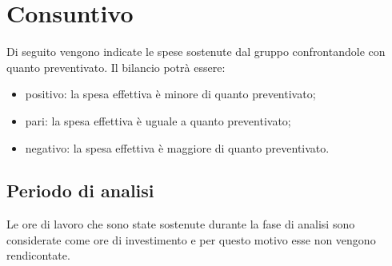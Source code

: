 \chapter{Consuntivo}\label{Consuntivo}
Di seguito vengono indicate le spese sostenute dal gruppo confrontandole con quanto preventivato. Il bilancio potrà essere:
\begin{itemize}
	\item positivo: la spesa effettiva è minore di quanto preventivato;
	\item pari: la spesa effettiva è uguale a quanto preventivato;
	\item negativo: la spesa effettiva è maggiore di quanto preventivato.
\end{itemize}
\section{Periodo di analisi}\label{ConsuntivoPeriodoDiAnalisi}
Le ore di lavoro che sono state sostenute durante la fase di analisi sono considerate come ore di investimento e per questo motivo esse non vengono rendicontate.
\quad
\def\tabularxcolumn#1{m{#1}}
